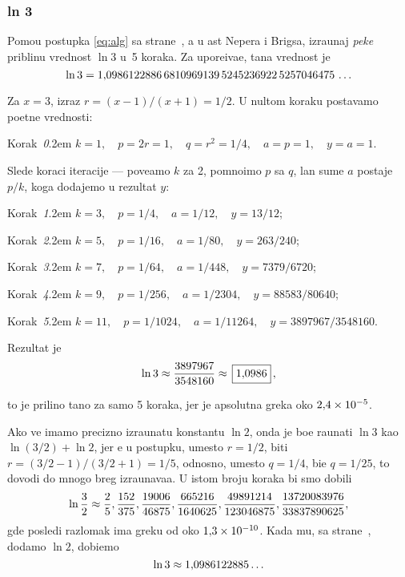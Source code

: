 \subsubsection{ln 3}\label{sssec:ln3}
 
\zadatak
Pomo{\cc}u postupka \eqref{eq:alg} sa 
strane~\pageref{eq:alg}, a u {\cv}ast Nepera i Brigsa,
izra{\cv}unaj {\sl pe{\sv}ke\/} pribli{\zv}nu vrednost $\ln 3$
u~5 koraka. Za upore{\dj}iva{\nj}e, ta{\cv}na vrednost je
$$
\ln3=1\.
0986122886\,
6810969139\,
5245236922\,
5257046475\,\ldots
$$

\def\step#1{\par\smallskip\indent\leavevmode
  Korak~{\it#1}.\kern2em\relax}

\resenje
Za $x=3$, izraz $r=(x-1)/(x+1)=1/2$. U nultom koraku postav{\lj}amo po{\cv}etne vrednosti:
\step0 $k=1,\quad p=2r=1,\quad q=r^2=1/4,\quad a=p=1,\quad y=a=1$.

\smallskip
\noindent Slede koraci iteracije --- pove{\cc}amo $k$ za 2, pomno{\zv}imo $p$ sa $q$,
{\cv}lan sume $a$ postaje $p/k$, koga dodajemo u rezultat $y$:

\step1 $k=3,\quad p=1/4,\quad a=1/12,\quad y=13/12$;
\step2 $k=5,\quad p=1/16,\quad a=1/80,\quad y=263/240$;
\step3 $k=7,\quad p=1/64,\quad a=1/448,\quad y=7379/6720$;
\step4 $k=9,\quad p=1/256,\quad a=1/2304,\quad y=88583/80640$;
\step5 $k=11,\quad p=1/1024,\quad a=1/11264,\quad y=3897967/3548160$.

\medskip
\noindent Rezultat je
$$
\ln3\approx\frac{3897967}{3548160}\approx \ram{1\.0986},
$$

\smallskip\noindent
{\sv}to je prili{\cv}no ta{\cv}no za samo 5 koraka, jer je apsolutna gre{\sv}ka oko $2\.4\puta10^{-5}$.

\iffalse
Da smo ra{\cv}unali u 20 koraka, 
dobili bi smo $\ln3\approx\frac{636083906982236368109838473}{578988523561291667944243200}$, 
gre{\sv}ka bi bila oko $7\puta10^{-15}$, {\sv}to je preciznost s kojom je 1617.\ godine Brigs
izra{\cv}unao svoje prve logaritamske tablice.
\fi

\dodatak
Ako ve{\cc} imamo precizno izra{\cv}unatu konstantu $\ln2$, onda je bo{\lj}e ra{\cv}unati $\ln3$ kao $\ln(3/2)+\ln2$,
jer {\cc}e u postupku, umesto $r=1/2$, biti $r=(3/2-1)/(3/2+1)=1/5$, 
odnosno, umesto $q=1/4$, bi{\cc}e $q=1/25$,
{\sv}to dovodi do mnogo br{\zv}eg izra{\cv}unava{\nj}a. U istom broju koraka bi smo dobili
$$
\ln\frac32\approx
\ff2/5, \ff152/375, \ff19006/46875, \ff665216/1640625, \ff49891214/123046875, 
\ff13720083976/33837890625,
$$
gde posled{\nj}i razlomak ima gre{\sv}ku od oko $1\.3\puta10^{-10}$.
Kada mu, sa strane~\pageref{ln2}, dodamo $\ln2$, dobi{\cc}emo
$$\ln3\approx1\.0986122885\ldots$$

